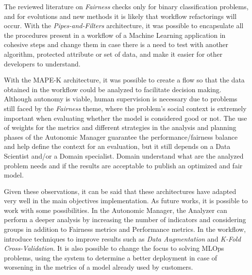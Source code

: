 \documentclass[10pt,conference]{IEEEtran}
\begin{document}
The reviewed literature on \textit{Fairness} checks only for binary classification problems, and for evolutions and new methods it is likely that workflow refactorings will occur. With the \textit{Pipes-and-Filters} architecture, it was possible to encapsulate all the procedures present in a workflow of a Machine Learning application in cohesive steps and change them in case there is a need to test with another algorithm, protected attribute or set of data, and make it easier for other developers to understand.

With the MAPE-K architecture, it was possible to create a flow so that the data obtained in the workflow could be analyzed to facilitate decision making. Although autonomy is viable, human supervision is necessary due to problems still faced by the \textit{Fairness} theme, where the problem's social context is extremely important when evaluating whether the model is considered good or not. The use of weights for the metrics and different strategies in the analysis and planning phases of the Autonomic Manager guarantee the performance/fairness balance and help define the context for an evaluation, but it still depends on a Data Scientist and/or a Domain specialist. Domain understand what are the analyzed problem needs and if the results are acceptable to publish an optimized and fair model.

Given these observations, it can be said that these architectures have adapted very well in the main objectives implementation. As future works, it is possible to work with some possibilities. In the Autonomic Manager, the Analyzer can perform a deeper analysis by increasing the number of indicators and considering groups in addition to Fairness metrics and Performance metrics. In the workflow, introduce techniques to improve results such as \textit{Data Augmentation} and \textit{K-Fold Cross-Validation}. It is also possible to change the focus to solving MLOps problems, using the system to determine a better deployment in case of worsening in the metrics of a model already used by customers.



\end{document}
